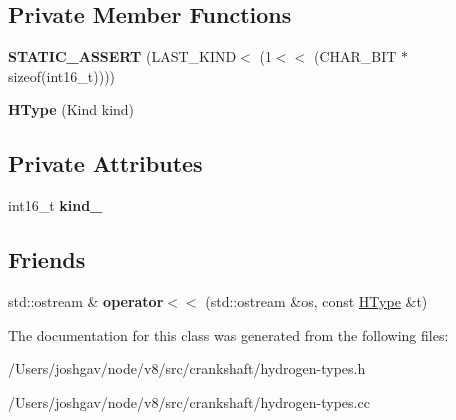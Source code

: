 \subsection*{Private Member Functions}
\begin{DoxyCompactItemize}
\item 
{\bfseries S\+T\+A\+T\+I\+C\+\_\+\+A\+S\+S\+E\+RT} (L\+A\+S\+T\+\_\+\+K\+I\+ND$<$ (1$<$$<$ (C\+H\+A\+R\+\_\+\+B\+IT $\ast$sizeof(int16\+\_\+t))))\hypertarget{classv8_1_1internal_1_1_h_type_ab848bf712a73a361d7edba3190b0cec2}{}\label{classv8_1_1internal_1_1_h_type_ab848bf712a73a361d7edba3190b0cec2}

\item 
{\bfseries H\+Type} (Kind kind)\hypertarget{classv8_1_1internal_1_1_h_type_a4d559b3e1d1e3c28b1908e674d717b92}{}\label{classv8_1_1internal_1_1_h_type_a4d559b3e1d1e3c28b1908e674d717b92}

\end{DoxyCompactItemize}
\subsection*{Private Attributes}
\begin{DoxyCompactItemize}
\item 
int16\+\_\+t {\bfseries kind\+\_\+}\hypertarget{classv8_1_1internal_1_1_h_type_a2ced156067f0f20cd15756bcaa6192ec}{}\label{classv8_1_1internal_1_1_h_type_a2ced156067f0f20cd15756bcaa6192ec}

\end{DoxyCompactItemize}
\subsection*{Friends}
\begin{DoxyCompactItemize}
\item 
std\+::ostream \& {\bfseries operator$<$$<$} (std\+::ostream \&os, const \hyperlink{classv8_1_1internal_1_1_h_type}{H\+Type} \&t)\hypertarget{classv8_1_1internal_1_1_h_type_acbf2ed6e7c19c8a54ad6635766711802}{}\label{classv8_1_1internal_1_1_h_type_acbf2ed6e7c19c8a54ad6635766711802}

\end{DoxyCompactItemize}


The documentation for this class was generated from the following files\+:\begin{DoxyCompactItemize}
\item 
/\+Users/joshgav/node/v8/src/crankshaft/hydrogen-\/types.\+h\item 
/\+Users/joshgav/node/v8/src/crankshaft/hydrogen-\/types.\+cc\end{DoxyCompactItemize}
